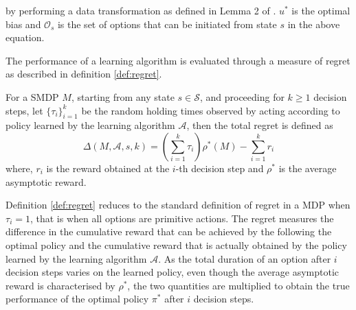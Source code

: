by performing a data transformation as defined in Lemma 2 of \cite{federgruen_denumerable_1983}. $u^*$ is the optimal bias and $\mathcal{O}_s$ is the set of options that can be initiated from state $s$ in the above equation.

The performance of a learning algorithm is evaluated through a measure of regret as described in definition \ref{def:regret}.

\begin{definition}
\label{def:regret}
For a SMDP $M$, starting from any state $s \in \mathcal{S}$, and proceeding for $k \ge 1$ decision steps, let $\{\tau_i\}_{i=1}^k$ be the random holding times observed by acting according to policy learned by the learning algorithm $\mathcal{A}$, then the total regret is defined as
\begin{equation}
    \Delta(M, \mathcal{A}, s, k) = \left( \sum_{i=1}^k \tau_i \right) \rho^*(M) - \sum_{i=1}^k r_i
\end{equation}
where, $r_i$ is the reward obtained at the $i$-th decision step and $\rho^*$ is the average asymptotic reward.
\end{definition}

Definition \ref{def:regret} reduces to the standard definition of regret in a MDP when $\tau_i = 1$, that is when all options are primitive actions.
The regret measures the difference in the cumulative reward that can be achieved by the following the optimal policy and the cumulative reward that is actually obtained by the policy learned by the learning algorithm $\mathcal{A}$.
As the total duration of an option after $i$ decision steps varies on the learned policy, even though the average asymptotic reward is characterised by $\rho^*$, the two quantities are multiplied to obtain the true performance of the optimal policy $\pi^*$ after $i$ decision steps.

